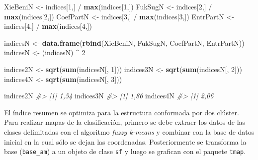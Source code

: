 \documentclass[11pt,b5paper,]{krantz}
\newenvironment{Shaded}{}{}
\newcommand{\KeywordTok}[1]{\textcolor[rgb]{0.00,0.44,0.13}{\textbf{#1}}}
\newcommand{\DecValTok}[1]{\textcolor[rgb]{0.25,0.63,0.44}{#1}}
\newcommand{\StringTok}[1]{\textcolor[rgb]{0.25,0.44,0.63}{#1}}
\newcommand{\CommentTok}[1]{\textcolor[rgb]{0.38,0.63,0.69}{\textit{#1}}}
\newcommand{\OperatorTok}[1]{\textcolor[rgb]{0.40,0.40,0.40}{#1}}
\newcommand{\NormalTok}[1]{#1}
\begin{document}
\begin{Shaded}
\begin{Highlighting}[]
\NormalTok{XieBeniN <-}\StringTok{ }\NormalTok{indices[}\DecValTok{1}\NormalTok{,] }\OperatorTok{/}\StringTok{ }\KeywordTok{max}\NormalTok{(indices[}\DecValTok{1}\NormalTok{,])}
\NormalTok{FukSugN <-}\StringTok{ }\NormalTok{indices[}\DecValTok{2}\NormalTok{,] }\OperatorTok{/}\StringTok{ }\KeywordTok{max}\NormalTok{(indices[}\DecValTok{2}\NormalTok{,])}
\NormalTok{CoefPartN <-}\StringTok{ }\NormalTok{indices[}\DecValTok{3}\NormalTok{,] }\OperatorTok{/}\StringTok{ }\KeywordTok{max}\NormalTok{(indices[}\DecValTok{3}\NormalTok{,])}
\NormalTok{EntrPartN <-}\StringTok{ }\NormalTok{indices[}\DecValTok{4}\NormalTok{,] }\OperatorTok{/}\StringTok{ }\KeywordTok{max}\NormalTok{(indices[}\DecValTok{4}\NormalTok{,])}

\NormalTok{indicesN <-}
\StringTok{  }\KeywordTok{data.frame}\NormalTok{(}\KeywordTok{rbind}\NormalTok{(XieBeniN, FukSugN, }
\NormalTok{                   CoefPartN, EntrPartN))}
\NormalTok{indicesN <-}\StringTok{ }\NormalTok{(indicesN) }\OperatorTok{^}\StringTok{ }\DecValTok{2}

\NormalTok{indices2N <-}\StringTok{ }\KeywordTok{sqrt}\NormalTok{(}\KeywordTok{sum}\NormalTok{(indicesN[, }\DecValTok{1}\NormalTok{]))}
\NormalTok{indices3N <-}\StringTok{ }\KeywordTok{sqrt}\NormalTok{(}\KeywordTok{sum}\NormalTok{(indicesN[, }\DecValTok{2}\NormalTok{]))}
\NormalTok{indices4N <-}\StringTok{ }\KeywordTok{sqrt}\NormalTok{(}\KeywordTok{sum}\NormalTok{(indicesN[, }\DecValTok{3}\NormalTok{]))}

\NormalTok{indices2N}
\CommentTok{#> [1] 1,54}
\NormalTok{indices3N}
\CommentTok{#> [1] 1,86}
\NormalTok{indices4N}
\CommentTok{#> [1] 2,06}
\end{Highlighting}
\end{Shaded}

El índice resumen se optimiza para la estructura conformada por dos
clúster. Para realizar mapas de la clasificación, primero se debe
extraer los datos de las clases delimitadas con el algoritmo \emph{fuzzy
k-means} y combinar con la base de datos inicial en la cual sólo se
dejan las coordenadas. Posteriormente se transforma la base
(\texttt{base\_am}) a un objeto de clase \texttt{sf} y luego se grafican
con el paquete \texttt{tmap}.
\end{document}
